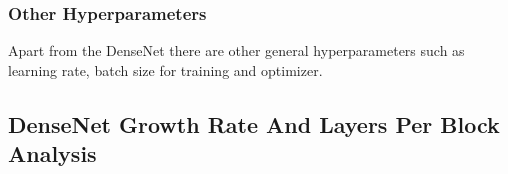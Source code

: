 \subsubsection{Other Hyperparameters}
Apart from the DenseNet there are other general hyperparameters such as learning rate, batch size for training and optimizer. 


\subsection{DenseNet Growth Rate And Layers Per Block Analysis}

